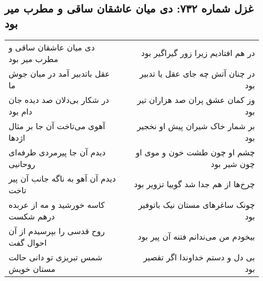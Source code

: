 \begin{center}
\section*{غزل شماره ۷۳۲: دی میان عاشقان ساقی و مطرب میر بود}
\label{sec:0732}
\begin{longtable}{l p{0.5cm} r}
دی میان عاشقان ساقی و مطرب میر بود
&&
در هم افتادیم زیرا زور گیراگیر بود
\\
عقل باتدبیر آمد در میان جوش ما
&&
در چنان آتش چه جای عقل یا تدبیر بود
\\
در شکار بی‌دلان صد دیده جان دام بود
&&
وز کمان عشق پران صد هزاران تیر بود
\\
آهوی می‌تاخت آن جا بر مثال اژدها
&&
بر شمار خاک شیران پیش او نخجیر بود
\\
دیدم آن جا پیرمردی طرفه‌ای روحانیی
&&
چشم او چون طشت خون و موی او چون شیر بود
\\
دیدم آن آهو به ناگه جانب آن پیر تاخت
&&
چرخ‌ها از هم جدا شد گوییا تزویر بود
\\
کاسه خورشید و مه از عربده درهم شکست
&&
چونک ساغرهای مستان نیک باتوفیر بود
\\
روح قدسی را بپرسیدم از آن احوال گفت
&&
بیخودم من می‌ندانم فتنه آن پیر بود
\\
شمس تبریزی تو دانی حالت مستان خویش
&&
بی دل و دستم خداوندا اگر تقصیر بود
\\
\end{longtable}
\end{center}
